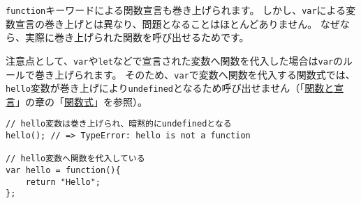 \texttt{function}キーワードによる関数宣言も巻き上げられます。
しかし、\texttt{var}による変数宣言の巻き上げとは異なり、問題となることはほとんどありません。
なぜなら、実際に巻き上げられた関数を呼び出せるためです。

注意点として、\texttt{var}や\texttt{let}などで宣言された変数へ関数を代入した場合は\texttt{var}のルールで巻き上げられます。
そのため、\texttt{var}で変数へ関数を代入する関数式では、\texttt{hello}変数が巻き上げにより\texttt{undefined}となるため呼び出せません（「\hyperlink{function-and-declaration}{関数と宣言}」の章の「\hyperlink{function-expression}{関数式}」を参照）。

\begin{lstlisting}
// hello変数は巻き上げられ、暗黙的にundefinedとなる
hello(); // => TypeError: hello is not a function

// hello変数へ関数を代入している
var hello = function(){
    return "Hello";
};
\end{lstlisting}

